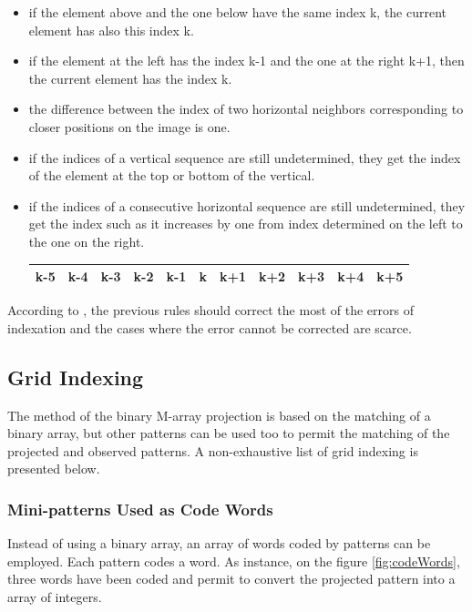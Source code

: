 \begin{itemize}
\item if the element above and the one below have the same index k, the current element has also this index k.
\item if the element at the left has the index k-1 and the one at the right k+1, then the current element has the index k.
\item the difference between the index of two horizontal neighbors corresponding to closer positions on the image is one.
\item if the indices of a vertical sequence are still undetermined, they get the index of the element at the top or bottom of the vertical.

\item if the indices of a consecutive horizontal sequence are still undetermined, they get the index such as it increases by one from index determined on the left to the one on the right.
\begin{tabular}{|*{11}{c|}}
    \hline
     k-5  & k-4  & k-3  & \textcolor[rgb]{1,0,0}{k-2}  & \textcolor[rgb]{1,0,0}{k-1}  & \textcolor[rgb]{1,0,0}{k}  & \textcolor[rgb]{1,0,0}{k+1}  & k+2  & k+3  & k+4 & k+5 \\
    \hline
\end{tabular}
\end{itemize}

According to \cite{morita1988reconstruction}, the previous rules should correct the most of the errors of indexation and the cases where the error cannot be corrected are scarce.







\subsection{Grid Indexing}

The method of the binary M-array projection is based on the matching of a binary array, but other patterns can be used too to permit the matching of the projected and observed patterns. A non-exhaustive list of grid indexing is presented below.

\subsubsection{Mini-patterns Used as Code Words}

Instead of using a binary array, an array of words coded by patterns can be employed. Each pattern codes a word. As instance, on the figure \ref{fig:codeWords}, three words have been coded and permit to convert the projected pattern into a array of integers.


